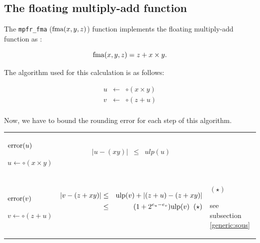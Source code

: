 \documentclass[12pt]{amsart}
\def\n{\textnormal}
\def\ulp{{\rm ulp}}
\begin{document}
\subsection{The floating multiply-add function}

The {\tt mpfr\_fma} ($\n{fma}(x,y,z)$) function implements the floating multiply-add function  as :

\[
\textnormal{fma} (x,y,z) = z + x \times y.
\]

The algorithm used for this calculation is as follows:

\begin{eqnarray}\nonumber
u&\leftarrow&\circ(x \times y)\\\nonumber
v&\leftarrow&\circ(z + u)\\\nonumber
\end{eqnarray}

Now, we have to bound the rounding error for each step of this
algorithm.



\begin{center}
\begin{tabular}{l l l}

\begin{minipage}{2.5cm}


${\textnormal{error}}(u)$


$u \leftarrow \circ(x \times y)$

\end{minipage} &
\begin{minipage}{7.5cm}

\begin{eqnarray}\nonumber
  |u-(xy)| &\leq& ulp(u)\\\nonumber
\end{eqnarray}

\end{minipage} &
\begin{minipage}{6cm}
{\hspace{7cm}}
\end{minipage}\\%
\begin{minipage}{2.5cm}
${\textnormal{error}}(v)$


$v \leftarrow \circ(z+u) $
\end{minipage} &
\begin{minipage}{8.5cm}
\begin{eqnarray}\nonumber
  |v-(z+xy)| &\leq& \ulp(v) + |(z+u) - (z+xy)|\\\nonumber
&\leq& (1+2^{e_u-e_v})\ulp(v)\;\;(\star)\\\nonumber
\end{eqnarray}
\end{minipage} &
\begin{minipage}{6cm}
$(\star)$

see subsection \ref{generic:sous}
\end{minipage}
\end{tabular}
\end{center}
\end{document}
